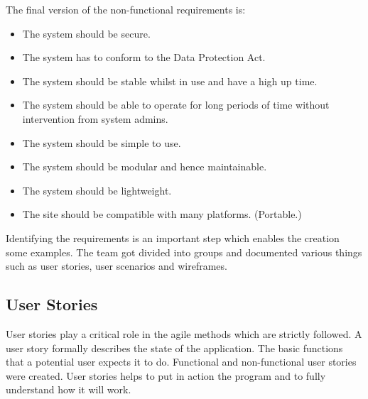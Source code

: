 \documentclass{l3proj}
\begin{document}
The final version of the non-functional requirements is:

\begin{itemize}

\item The system should be secure.

\item The system has to conform to the Data Protection Act.

\item The system should be stable whilst in use and have a high up time.

\item The system should be able to operate for long periods of time without intervention from system admins.

\item The system should be simple to use.

\item The system should be modular and hence maintainable.

\item The system should be lightweight.

\item The site should be compatible with many platforms. (Portable.)

\end{itemize}

Identifying the requirements is an important step which enables the creation some examples. The team got divided into groups and documented various things such as user stories, user scenarios and wireframes.

\subsection{User Stories}
\label{user_stories}

User stories \cite{UserStories} play a critical role in the agile methods which are strictly followed. A user story formally describes the state of the application. The basic functions that a potential user expects it to do. Functional and non-functional user stories were created. User stories helps to put in action the program and to fully understand how it will work.
\end{document}
